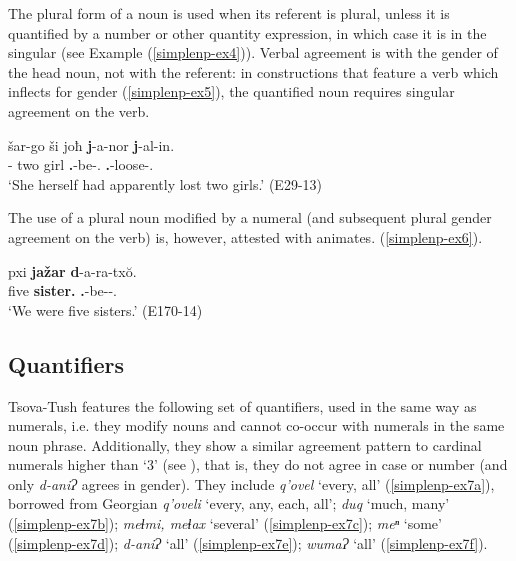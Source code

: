 The plural form of a noun is used when its referent is plural, unless it is quantified by a number or other quantity expression, in which case it is in the singular (see Example (\ref{simplenp-ex4})). Verbal agreement is with the gender of the head noun, not with the referent: in constructions that feature a verb which inflects for gender (\ref{simplenp-ex5}), the quantified noun requires singular agreement on the verb.

\begin{exe}
	\ex\label{simplenp-ex5}
	\gll šar-go ši joħ \textbf{j}-a-nor \textbf{j}-al-in. \\
	{\Refl}-{\Adess} two girl \textbf{{\F}.{\Sg}}-be-{\Nw}.{\Rem} \textbf{{\F}.{\Sg}}-loose-{\Ptcp}.{\Aor}   \\
	\trans `She herself had apparently lost two girls.'
	\hfill (E29-13)
\end{exe}


The use of a plural noun modified by a numeral (and subsequent plural gender agreement on the verb) is, however, attested with animates. (\ref{simplenp-ex6}). 

\begin{exe}
	\ex\label{simplenp-ex6}
	\gll pxi \textbf{jažar} \textbf{d}-a-ra-tx\u{o}.  \\
	five \textbf{sister.{\Pl}} \textbf{{\F}.{\Pl}}-be-{\Aor}-{\Fpl}.{\Excl} \\
	\trans `We were five sisters.'
	\hfill (E170-14)
\end{exe}



\subsection{Quantifiers} \label{quantifiers}

Tsova-Tush features the following set of quantifiers, used in the same way as numerals, i.e. they  modify nouns and cannot co-occur with numerals in the same noun phrase. Additionally, they show a similar agreement pattern to cardinal numerals higher than `3' (see ), that is, they do not agree in case or number (and only \textit{d-aniɁ} agrees in gender). They include
\textit{q'ovel} `every, all' (\ref{simplenp-ex7a}), borrowed from Georgian \textit{q'oveli} `every, any, each, all';
\textit{duq} `much, many' (\ref{simplenp-ex7b});
\textit{meɬmi, meɬax} `several' (\ref{simplenp-ex7c});
\textit{meⁿ} `some' (\ref{simplenp-ex7d});
\textit{d-aniɁ}  `all' (\ref{simplenp-ex7e});
\textit{wumaɁ} `all' (\ref{simplenp-ex7f}).



